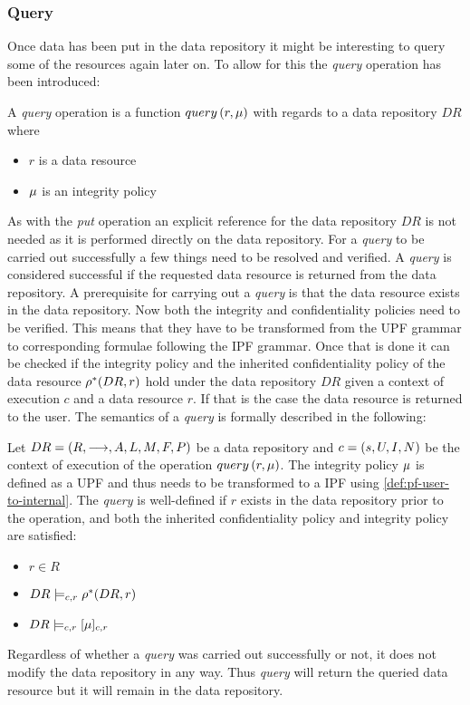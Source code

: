 \subsubsection{Query}\label{sec:query}
Once data has been put in the data repository it might be interesting to query some of the resources again later on. To allow for this the \emph{query} operation has been introduced:
\begin{definition}
A \emph{query} operation is a function $query \left( r, \mu \right)$ with regards to a data repository $DR$ where
\begin{itemize}
  \item $r$ is a data resource
  \item $\mu$ is an integrity policy
\end{itemize}
\end{definition}
As with the \emph{put} operation an explicit reference for the data repository $DR$ is not needed as it is performed directly on the data repository. For a \emph{query} to be carried out successfully a few things need to be resolved and verified. A \emph{query} is considered successful if the requested data resource is returned from the data repository. A prerequisite for carrying out a \emph{query} is that the data resource exists in the data repository. Now both the integrity and confidentiality policies need to be verified. This means that they have to be transformed from the UPF grammar to corresponding formulae following the IPF grammar. Once that is done it can be checked if the integrity policy and the inherited confidentiality policy of the data resource $\rho^{\ast}(DR,r)$ hold under the data repository $DR$ given a context of execution $c$ and a data resource $r$. If that is the case the data resource is returned to the user.
The semantics of a \emph{query} is formally described in the following:
\begin{definition}
Let $DR= \left( R, \longrightarrow, A, L, M, F, P \right)$ be a data repository and $c = \left( s, U, I, N \right)$ be the context of execution of the operation $query \left( r, \mu \right)$. The integrity policy $\mu$ is defined as a UPF and thus needs to be transformed to a IPF using \autoref{def:pf-user-to-internal}.
The \emph{query} is well-defined if $r$ exists in the data repository prior to the operation, and both the inherited confidentiality policy and integrity policy are satisfied:
\begin{itemize}
    \item $r \in R$
    \item $DR \models_{c,r} \rho^{\ast}(DR, r)$
    \item $DR \models_{c,r} [\mu]_{c,r}$
\end{itemize}
\end{definition}

Regardless of whether a \emph{query} was carried out successfully or not, it does not modify the data repository in any way. Thus \emph{query} will return the queried data resource but it will remain in the data repository. 